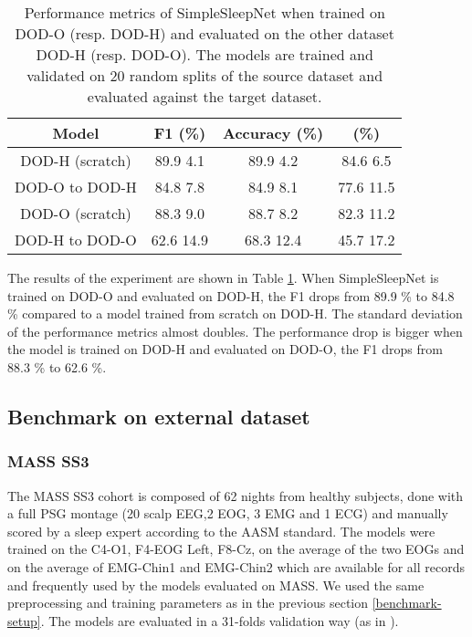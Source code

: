 \documentclass[journal]{IEEEtran}
\begin{document}
\begin{table}[ht]
\vspace{1em}
\centering
\begin{tabular}{|c c c c|} 
 \hline
 Model & F1 (\%) & Accuracy (\%)  &  (\%) \\ 
  \hline
     DOD-H (scratch) & 89.9  4.1& 89.9  4.2  & 84.6  6.5 \\ 
      DOD-O to DOD-H & 84.8  7.8  & 84.9  8.1   & 77.6  11.5  \\
\hhline{|====|}
 DOD-O (scratch)& 88.3  9.0 & 88.7  8.2  & 82.3  11.2  \\ 
    DOD-H to DOD-O & 62.6  14.9& 68.3  12.4  & 45.7  17.2  \\
    \hline
\end{tabular}
\caption{Performance metrics of SimpleSleepNet when trained on DOD-O (resp. DOD-H) and evaluated on the other dataset DOD-H (resp. DOD-O). The models are trained and validated on 20 random splits of the source dataset and evaluated against the target dataset.}
\label{tab:transfer_learning}
\vspace{-2em}
\end{table} 
The results of the experiment are shown in Table \ref{tab:transfer_learning}. When SimpleSleepNet is trained on DOD-O and evaluated on DOD-H, the F1 drops from 89.9 \% to 84.8 \% compared to a model trained from scratch on DOD-H. The standard deviation of the performance metrics almost doubles. The performance drop is bigger when the model is trained on DOD-H and evaluated on DOD-O, the F1 drops from 88.3 \% to 62.6 \%.


\subsection{Benchmark on external dataset}


\subsubsection{MASS SS3 \cite{OReilly2014}}
The MASS SS3 cohort is composed of 62 nights from healthy subjects, done with a full PSG montage (20 scalp EEG,2 EOG, 3 EMG and 1 ECG) and manually scored by a sleep expert according to the AASM standard. The models were trained on the C4-O1, F4-EOG Left, F8-Cz, on the average of the two EOGs and on the average of EMG-Chin1 and EMG-Chin2 which are available for all records and frequently used by the models evaluated on MASS. We used the same preprocessing and training parameters as in the previous section \ref{benchmark-setup}. The models are evaluated in a 31-folds validation way (as in \cite{Supratak2017}).
\end{document}
